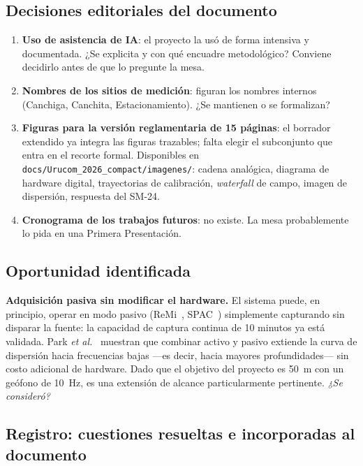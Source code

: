 \subsection{Decisiones editoriales del documento}

\begin{enumerate}[itemsep=0.35em]

\item \textbf{Uso de asistencia de IA}: el proyecto la us\'o de forma intensiva y
documentada. ¿Se explicita y con qu\'e encuadre metodol\'ogico? Conviene decidirlo antes de
que lo pregunte la mesa.

\item \textbf{Nombres de los sitios de medici\'on}: figuran los nombres internos
(Canchiga, Canchita, Estacionamiento). ¿Se mantienen o se formalizan?

\item \textbf{Figuras para la versi\'on reglamentaria de 15 p\'aginas}: el borrador
extendido ya integra las figuras trazables; falta elegir el subconjunto que entra en el
recorte formal. Disponibles en
\texttt{docs/Urucom\_2026\_compact/imagenes/}: cadena anal\'ogica, diagrama de hardware
digital, trayectorias de calibraci\'on, \emph{waterfall} de campo, imagen de dispersi\'on,
respuesta del SM-24.

\item \textbf{Cronograma de los trabajos futuros}: no existe. La mesa probablemente lo
pida en una Primera Presentaci\'on.

\end{enumerate}

\subsection{Oportunidad identificada}

\textbf{Adquisici\'on pasiva sin modificar el hardware.} El sistema puede, en principio,
operar en modo pasivo (ReMi~\cite{Louie2001}, SPAC~\cite{Aki1957}) simplemente
capturando sin disparar la fuente: la capacidad de captura continua de 10 minutos ya
est\'a validada. Park \emph{et al.}~\cite{Park2007} muestran que combinar activo y pasivo
extiende la curva de dispersi\'on hacia frecuencias bajas ---es decir, hacia mayores
profundidades--- sin costo adicional de hardware. Dado que el objetivo del proyecto es
\SI{50}{\meter} con un ge\'ofono de \SI{10}{\hertz}, es una extensi\'on de alcance
particularmente pertinente. \emph{¿Se consider\'o?}

\subsection{Registro: cuestiones resueltas e incorporadas al documento}

